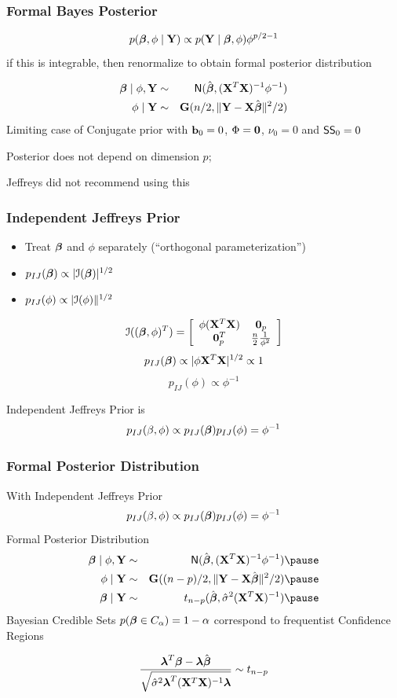 \documentclass[handout]{beamer}
\begin{document}
\begin{frame}
  \frametitle{Formal Bayes Posterior}
$$  p(\boldsymbol{\beta}, \phi \mid \mathbf{Y}) \propto p(\mathbf{Y} \mid \boldsymbol{\beta}, \phi)  \phi^{p/2 - 1} $$
\pause
if this is integrable, then renormalize to obtain formal posterior
distribution \pause


\begin{eqnarray*}
  \boldsymbol{\beta} \mid \phi, \mathbf{Y} & \sim & \textsf{N}(\hat{\boldsymbol{\beta}}, (\mathbf{X}^T\mathbf{X})^{-1} \phi^{-1}) \\
  \phi \mid \mathbf{Y} & \sim& \mathbf{G}(n/2, \| \mathbf{Y} - \mathbf{X}\hat{\boldsymbol{\beta}} \|^2/2)
\end{eqnarray*} \pause
Limiting case of Conjugate prior with $\mathbf{b}_0 = 0$, $\Phi = \mathbf{0}$,
$\nu_0 = 0$ and $\textsf{SS}_0 = 0$ \pause

Posterior does not depend on dimension $p$;   \pause

\vfill
Jeffreys did not recommend using this 
\end{frame}
\begin{frame}
  \frametitle{Independent Jeffreys Prior}
  \begin{itemize}
  \item  Treat $\boldsymbol{\beta}$ and $\phi$ separately  (``orthogonal
    parameterization'') \pause
  \item $p_{IJ}(\boldsymbol{\beta}) \propto |{\cal{I}}(\boldsymbol{\beta})|^{1/2}$ \pause
\item $p_{IJ}(\phi) \propto |{\cal{I}}(\phi)\|^{1/2}$ \pause
  \end{itemize}
$$
{\cal{I}}((\boldsymbol{\beta}, \phi)^T)  =  \left[
  \begin{array}{cc}
    \phi (\mathbf{X}^T\mathbf{X}) & \mathbf{0}_p \\
  \mathbf{0}_p^T & \frac{n}{2} \frac{1}{\phi^2} 
  \end{array}
\right]
$$
\pause
$$p_{IJ}(\boldsymbol{\beta}) \propto |\phi \mathbf{X}^T\mathbf{X}|^{1/2} \propto 1$$ \pause
$$p_{IJ}(\phi) \propto \phi^{-1}$$ \pause

Independent Jeffreys Prior is 
$$p_{IJ}(\beta, \phi) \propto p_{IJ}(\boldsymbol{\beta}) p_{IJ}(\phi) = \phi^{-1}$$
  
\end{frame}
\begin{frame}
  \frametitle{Formal Posterior Distribution}
  With Independent Jeffreys Prior
$$p_{IJ}(\beta, \phi) \propto p_{IJ}(\boldsymbol{\beta}) p_{IJ}(\phi) = \phi^{-1}$$
\pause
Formal Posterior Distribution
\pause
\begin{eqnarray*}
  \b \mid \phi, \Y & \sim & \N(\bhat, (\X^T\X)^{-1} \phi^{-1}) \pause \\
  \phi \mid \Y & \sim& \G((n-p)/2, \| \Y - \X\bhat \|^2/2) \pause\\
\b \mid \Y & \sim & t_{n-p}(\bhat, \shat (\X^T\X)^{-1})\pause
\end{eqnarray*}
Bayesian Credible Sets
$p(\boldsymbol{\beta} \in C_\alpha) = 1- \alpha$ correspond to frequentist Confidence
Regions

$$\frac{\boldsymbol{\lambda}^T\boldsymbol{\beta} - \boldsymbol{\lambda}\hat{\boldsymbol{\beta}}}
{\sqrt{{\hat{\sigma}}^2 \boldsymbol{\lambda}^T(\mathbf{X}^T\mathbf{X})^{-1} \boldsymbol{\lambda}}} \sim t_{n-p}$$

\end{frame}
\end{document}
